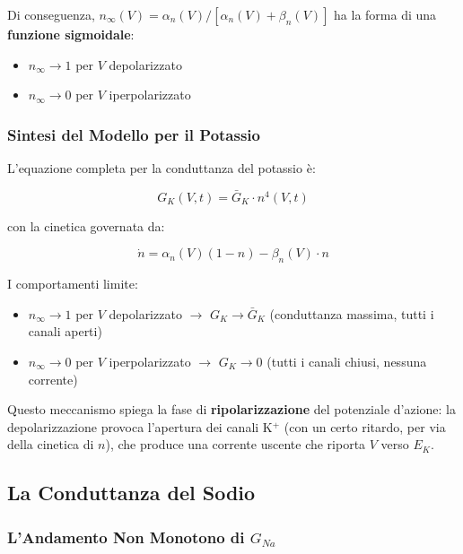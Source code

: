Di conseguenza, $n_\infty(V) = \alpha_n(V)/[\alpha_n(V) + \beta_n(V)]$ ha la forma di una \textbf{funzione sigmoidale}:
\begin{itemize}
    \item $n_\infty \to 1$ per $V$ depolarizzato
    \item $n_\infty \to 0$ per $V$ iperpolarizzato
\end{itemize}



\subsubsection{Sintesi del Modello per il Potassio}

L'equazione completa per la conduttanza del potassio è:

\begin{equation}
G_K(V, t) = \bar{G}_K \cdot n^4(V, t)
\end{equation}

con la cinetica governata da:

\begin{equation}
\dot{n} = \alpha_n(V)(1-n) - \beta_n(V) \cdot n
\end{equation}

I comportamenti limite:
\begin{itemize}
    \item $n_\infty \to 1$ per $V$ depolarizzato $\rightarrow$ $G_K \to \bar{G}_K$ (conduttanza massima, tutti i canali aperti)
    \item $n_\infty \to 0$ per $V$ iperpolarizzato $\rightarrow$ $G_K \to 0$ (tutti i canali chiusi, nessuna corrente)
\end{itemize}

Questo meccanismo spiega la fase di \textbf{ripolarizzazione} del potenziale d'azione: la depolarizzazione provoca l'apertura dei canali K$^+$ (con un certo ritardo, per via della cinetica di $n$), che produce una corrente uscente che riporta $V$ verso $E_K$.



\subsection{La Conduttanza del Sodio}

\subsubsection{L'Andamento Non Monotono di $G_{Na}$}

